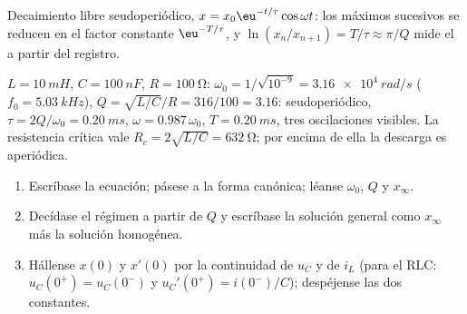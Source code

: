 \begin{omfigure}

{\small Decaimiento libre seudoperiódico, $x = x_0\eu^{-t/\tau}\cos\omega t$:
los máximos sucesivos se reducen en el factor constante $\eu^{-T/\tau}$, y
$\ln(x_n/x_{n+1}) = T/\tau \approx \pi/Q$ mide el  a
partir del registro.}
\end{omfigure}

\begin{example}\label{ex:b1:transient-regimes:rlcnum}
$L = \qty{10}{mH}$, $C = \qty{100}{nF}$, $R = \qty{100}{\ohm}$:
$\omega_0 = 1/\sqrt{10^{-9}} = \qty{3.16e4}{rad/s}$ ($f_0 =
\qty{5.03}{kHz}$), $Q = \sqrt{L/C}/R = 316/100 = 3.16$: seudoperiódico,
$\tau = 2Q/\omega_0 = \qty{0.20}{ms}$, $\omega = 0.987\,\omega_0$,
$T = \qty{0.20}{ms}$, tres oscilaciones visibles. La resistencia crítica
vale $R_c = 2\sqrt{L/C} = \qty{632}{\ohm}$; por encima de ella la descarga
es aperiódica.
\end{example}

\begin{method}\label{met:b1:transient-regimes:second}
\begin{enumerate}
  \item Escríbase la ecuación; pásese a la forma canónica; léanse
        $\omega_0$, $Q$ y $x_\infty$.
  \item Decídase el régimen a partir de $Q$ y escríbase la solución
        general como $x_\infty$ más la solución homogénea.
  \item Hállense $x(0)$ y $x'(0)$ por la continuidad de $u_C$ y de $i_L$
        (para el RLC: $u_C(0^+) = u_C(0^-)$ y $u_C'(0^+) = i(0^-)/C$);
        despéjense las dos constantes.
\end{enumerate}
\end{method}

